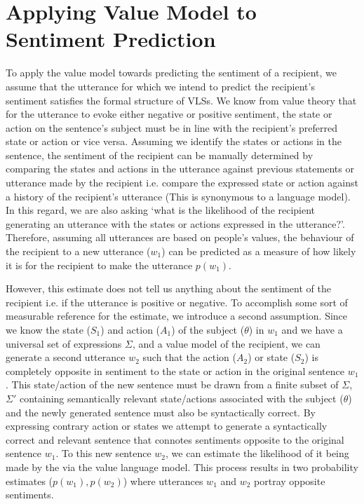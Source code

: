 \section{Applying Value Model to Sentiment Prediction}
To apply the value model towards predicting the sentiment of a recipient, we assume that the utterance for which we intend to predict the recipient's sentiment satisfies the formal structure of VLSs.
We know from value theory that for the utterance to evoke either negative or positive sentiment, the state or action on the sentence's subject must be in line with the recipient's preferred state or action or vice versa. Assuming we identify the states or actions in the sentence, the sentiment of the recipient can be manually determined by comparing the states and actions in the utterance against previous statements or utterance made by the recipient i.e. compare the expressed state or action against a history of the recipient's utterance (This is synonymous to a language model). In this regard, we are also asking `what is the likelihood of the recipient generating an utterance with the states or actions expressed in the utterance?'. Therefore, assuming all utterances are based on people's values, the behaviour of the recipient to a new utterance ($w_1$) can be predicted as a measure of how likely it is for the recipient to make the utterance $p(w_1)$. 

However, this estimate does not tell us anything about the sentiment of the recipient i.e. if the utterance is positive or negative. To accomplish some sort of measurable reference for the estimate, we introduce a second assumption. Since we know the state ($S_1$) and action ($A_1$) of the subject ($\theta$) in $w_1$ and we have a universal set of expressions $\Sigma$, and a value model of the recipient, we can generate a second utterance $w_2$ such that the action ($A_2$) or state ($S_2$) is completely opposite in sentiment to the state or action in the original sentence $w_1$. This state/action of the new sentence must be drawn from a finite subset of $\Sigma$, $\Sigma'$ containing semantically relevant state/actions associated with the subject ($\theta$) and the newly generated sentence must also be syntactically correct. By expressing contrary action or states we attempt to generate a syntactically correct and relevant sentence that connotes sentiments opposite to the original sentence $w_1$. To this new sentence $w_2$, we can estimate the likelihood of it being made by the via the value language model. This process results in two probability estimates ($p(w_1),p(w_2)$) where utterances $w_1$ and $w_2$ portray opposite sentiments. 


